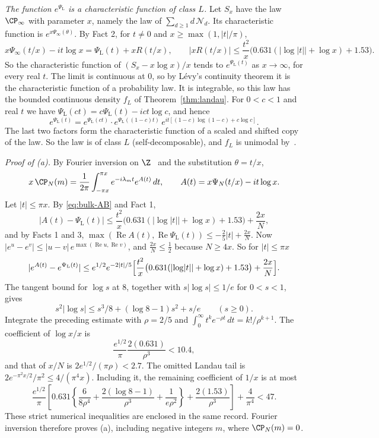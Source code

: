 \emph{The function $e^{\Psi_{\mathrm L}}$ is a characteristic function of class $L$.} Let
$S_x$ have the law $\CP_\infty$ with parameter $x$, namely the law of
$\sum_{d\ge1}d\,\mathcal N_d$. Its characteristic function is
$e^{x\Psi_\infty(\theta)}$. By Fact 2, for $t\ne0$ and
$x\ge\max(1,\lvert t\rvert/\pi)$,
\begin{equation}\label{eq:bulk-AB}
 x\Psi_\infty(t/x)-it\log x=\Psi_{\mathrm L}(t)+xR(t/x),\qquad
 \lvert xR(t/x)\rvert\le\frac{t^2}x\bigl(0.631(\lvert\log\lvert t\rvert\rvert+\log x)+1.53\bigr).
\end{equation}
So the characteristic function of $(S_x-x\log x)/x$ tends to $e^{\Psi_{\mathrm L}(t)}$ as
$x\to\infty$, for every real $t$. The limit is continuous at $0$, so by
L\'evy's continuity theorem it is the characteristic function of a
probability law. It is integrable, so this law has the bounded continuous
density $f_L$ of Theorem~\ref{thm:landau}. For $0<c<1$ and real $t$ we have
$\Psi_{\mathrm L}(ct)=c\Psi_{\mathrm L}(t)-ict\log c$, and hence
\[
 e^{\Psi_{\mathrm L}(t)}=e^{\Psi_{\mathrm L}(ct)}\cdot e^{\Psi_{\mathrm L}((1-c)t)}\,e^{it[(1-c)\log(1-c)+c\log c]} .
\]
The last two factors form the characteristic function of a scaled and shifted
copy of the law. So the law is of class $L$ (self-decomposable), and $f_L$ is
unimodal by~\cite{yamazato1978}.

\emph{Proof of (a).} By Fourier inversion on $\Z$~\cite{katznelson2004} and the substitution
$\theta=t/x$,
\[
 x\,\CP_N(m)=\frac1{2\pi}\int_{-\pi x}^{\pi x}e^{-i\lambda_mt}e^{A(t)}\,dt,\qquad
 A(t)=x\Psi_N(t/x)-it\log x .
\]
Let $\lvert t\rvert\le\pi x$. By \eqref{eq:bulk-AB} and Fact 1,
\[
 \lvert A(t)-\Psi_{\mathrm L}(t)\rvert\le\frac{t^2}x\bigl(0.631(\lvert\log\lvert t\rvert\rvert+\log x)+1.53\bigr)+\frac{2x}N,
\]
and by Facts 1 and 3,
$\max(\operatorname{Re}A(t),\operatorname{Re}\Psi_{\mathrm L}(t))\le-\frac25\lvert t\rvert+\frac{2x}N$.
Now $\lvert e^u-e^v\rvert\le\lvert u-v\rvert\,e^{\max(\operatorname{Re}u,\operatorname{Re}v)}$,
and $\frac{2x}N\le\frac12$ because $N\ge4x$. So for $\lvert t\rvert\le\pi x$
\[
 \lvert e^{A(t)}-e^{\Psi_{\mathrm L}(t)}\rvert\le e^{1/2}e^{-2\lvert t\rvert/5}
 \Bigl[\frac{t^2}x\bigl(0.631(\lvert\log\lvert t\rvert\rvert+\log x)+1.53\bigr)+\frac{2x}N\Bigr].
\]
The tangent bound for $\log s$ at $8$, together with
$s|\log s|\le1/e$ for $0<s<1$, gives
\[
 s^2|\log s|\le s^3/8+(\log8-1)s^2+s/e\qquad(s\ge0).
\]
Integrate the preceding estimate with $\rho=2/5$ and
$\int_0^\infty t^ke^{-\rho t}\,dt=k!/\rho^{k+1}$. The coefficient of
$\log x/x$ is
\[
 \frac{e^{1/2}}\pi\frac{2(0.631)}{\rho^3}<10.4,
\]
and that of $x/N$ is $2e^{1/2}/(\pi\rho)<2.7$.
The omitted Landau tail is
$2e^{-\pi^2x/2}/\pi^2\le4/(\pi^4x)$. Including it, the remaining
coefficient of $1/x$ is at most
\[
 \frac{e^{1/2}}\pi\left[
 0.631\left\{\frac6{8\rho^4}+\frac{2(\log8-1)}{\rho^3}
                         +\frac1{e\rho^2}\right\}
              +\frac{2(1.53)}{\rho^3}\right]+\frac4{\pi^4}<47.
\]
These strict numerical inequalities are enclosed in the same record.
Fourier inversion therefore proves (a), including negative integers
$m$, where $\CP_N(m)=0$.

